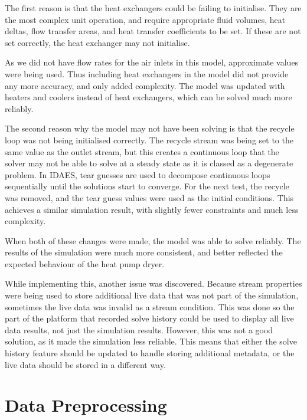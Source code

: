 The first reason is that the heat exchangers could be failing to initialise. They are the most complex unit operation, and require appropriate fluid volumes, heat deltas, flow transfer areas, and heat transfer coefficients to be set. If these are not set correctly, the heat exchanger may not initialise. 

As we did not have flow rates for the air inlets in this model, approximate values were being used. Thus including heat exchangers in the model did not provide any more accuracy, and only added complexity. The model was updated with heaters and coolers instead of heat exchangers, which can be solved much more reliably.

The second reason why the model may not have been solving is that the recycle loop was not being initialised correctly. The recycle stream was being set to the same value as the outlet stream, but this creates a continuous loop that the solver may not be able to solve at a steady state as it is classed as a degenerate problem.
In IDAES, tear guesses are used to decompose continuous loops sequentially until the solutions start to converge.
For the next test, the recycle was removed, and the tear guess values were used as the initial conditions. This achieves a similar simulation result, with slightly fewer constraints and much less complexity.


When both of these changes were made, the model was able to solve reliably. The results of the simulation were much more consistent, and better reflected the expected behaviour of the heat pump dryer.


While implementing this, another issue was discovered. Because stream properties were being used to store additional live data that was not part of the simulation, sometimes the live data was invalid as a stream condition. This was done so the part of the platform that recorded solve history could be used to display all live data results, not just the simulation results. However, this was not a good solution, as it made the simulation less reliable. This means that either the solve history feature should be updated to handle storing additional metadata, or the live data should be stored in a different way.



\section{Data Preprocessing} \label{sec:datapreprocessing}


